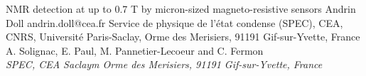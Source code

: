 \begin{conf-abstract}[]
{NMR detection at up to 0.7 T by micron-sized magneto-resistive sensors}
{\color{blue} Andrin Doll}
{andrin.doll@cea.fr}
{Service de physique de l'état condense (SPEC), CEA, CNRS, Université Paris-Saclay, Orme des Merisiers, 91191 Gif-sur-Yvette, France}
{{\color{blue}A. Solignac, E. Paul, M. Pannetier-Lecoeur and C. Fermon}\\ \textit{SPEC, CEA Saclaym Orme des Merisiers, 91191 Gif-sur-Yvette, France}\\ 
\decofourleft \decofourright}





\printbibliography[heading=none]

\end{conf-abstract}
